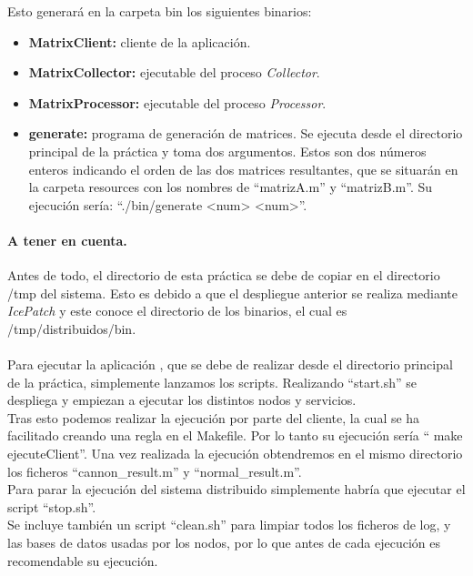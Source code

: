 Esto generará en la carpeta bin los siguientes binarios:
\begin{itemize}
\item \textbf{MatrixClient:} cliente de la aplicación.
\item \textbf{MatrixCollector:} ejecutable del proceso \emph{Collector}.
\item \textbf{MatrixProcessor:} ejecutable del proceso \emph{Processor}.
\item \textbf{generate:} programa de generación de matrices. Se ejecuta desde el directorio principal de la práctica y toma dos argumentos. Estos son dos números enteros indicando el orden de las dos matrices resultantes, que se situarán en la carpeta resources con los nombres de ``matrizA.m'' y ``matrizB.m''. Su ejecución sería: ``./bin/generate <num> <num>''.
\end{itemize}

\paragraph{A tener en cuenta.}


Antes de todo, el directorio de esta práctica se debe de copiar en el directorio /tmp del sistema. Esto es debido a que el despliegue anterior se realiza mediante \emph{IcePatch} y este conoce el directorio de los binarios, el cual es /tmp/distribuidos/bin.

\paragraph{}
Para ejecutar la aplicación , que se debe de realizar desde el directorio principal de la práctica, simplemente lanzamos los scripts.
Realizando ``start.sh'' se despliega y empiezan a ejecutar los distintos nodos y servicios. \\
Tras esto podemos realizar la ejecución por parte del cliente, la cual se ha facilitado creando una regla en el Makefile. Por lo tanto su ejecución sería `` make ejecuteClient''. Una vez realizada la ejecución obtendremos en el mismo directorio los ficheros ``cannon\_result.m'' y ``normal\_result.m''. \\
Para parar la ejecución del sistema distribuido simplemente habría que ejecutar el script ``stop.sh''. \\
Se incluye también un script ``clean.sh'' para limpiar todos los ficheros de log, y las bases de datos usadas por los nodos, por lo que antes de cada ejecución es recomendable su ejecución.
